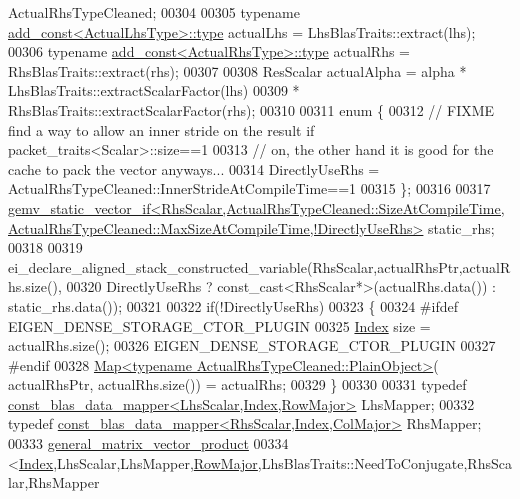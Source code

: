 \begin{DoxyCode}
      ActualRhsTypeCleaned;
00304 
00305     \textcolor{keyword}{typename} \hyperlink{group___core___module_class_eigen_1_1_transpose}{add\_const<ActualLhsType>::type} actualLhs = 
      LhsBlasTraits::extract(lhs);
00306     \textcolor{keyword}{typename} \hyperlink{group___core___module_class_eigen_1_1_transpose}{add\_const<ActualRhsType>::type} actualRhs = 
      RhsBlasTraits::extract(rhs);
00307 
00308     ResScalar actualAlpha = alpha * LhsBlasTraits::extractScalarFactor(lhs)
00309                                   * RhsBlasTraits::extractScalarFactor(rhs);
00310 
00311     \textcolor{keyword}{enum} \{
00312       \textcolor{comment}{// FIXME find a way to allow an inner stride on the result if packet\_traits<Scalar>::size==1}
00313       \textcolor{comment}{// on, the other hand it is good for the cache to pack the vector anyways...}
00314       DirectlyUseRhs = ActualRhsTypeCleaned::InnerStrideAtCompileTime==1
00315     \};
00316 
00317     
      \hyperlink{struct_eigen_1_1internal_1_1gemv__static__vector__if}{
      gemv\_static\_vector\_if<RhsScalar,ActualRhsTypeCleaned::SizeAtCompileTime,ActualRhsTypeCleaned::MaxSizeAtCompileTime,!DirectlyUseRhs>}
       static\_rhs;
00318 
00319     ei\_declare\_aligned\_stack\_constructed\_variable(RhsScalar,actualRhsPtr,actualRhs.size(),
00320         DirectlyUseRhs ? \textcolor{keyword}{const\_cast<}RhsScalar*\textcolor{keyword}{>}(actualRhs.data()) : static\_rhs.data());
00321 
00322     \textcolor{keywordflow}{if}(!DirectlyUseRhs)
00323     \{
00324 \textcolor{preprocessor}{      #ifdef EIGEN\_DENSE\_STORAGE\_CTOR\_PLUGIN}
00325       \hyperlink{namespace_eigen_a62e77e0933482dafde8fe197d9a2cfde}{Index} size = actualRhs.size();
00326       EIGEN\_DENSE\_STORAGE\_CTOR\_PLUGIN
00327 \textcolor{preprocessor}{      #endif}
00328       \hyperlink{group___core___module_class_eigen_1_1_map}{Map<typename ActualRhsTypeCleaned::PlainObject>}(
      actualRhsPtr, actualRhs.size()) = actualRhs;
00329     \}
00330 
00331     \textcolor{keyword}{typedef} \hyperlink{class_eigen_1_1internal_1_1const__blas__data__mapper}{const\_blas\_data\_mapper<LhsScalar,Index,RowMajor>}
       LhsMapper;
00332     \textcolor{keyword}{typedef} \hyperlink{class_eigen_1_1internal_1_1const__blas__data__mapper}{const\_blas\_data\_mapper<RhsScalar,Index,ColMajor>}
       RhsMapper;
00333     \hyperlink{struct_eigen_1_1internal_1_1general__matrix__vector__product}{general\_matrix\_vector\_product}
00334         <\hyperlink{namespace_eigen_a62e77e0933482dafde8fe197d9a2cfde}{Index},LhsScalar,LhsMapper,\hyperlink{group__enums_ggaacded1a18ae58b0f554751f6cdf9eb13acfcde9cd8677c5f7caf6bd603666aae3}{RowMajor},LhsBlasTraits::NeedToConjugate,RhsScalar,RhsMapper

\end{DoxyCode}
